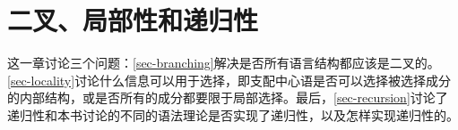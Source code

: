 
\chapter{二叉、局部性和递归性}
\label{Kapitel-Binarybranching-locality-recursion}

这一章讨论三个问题：\ref{sec-branching}解决是否所有语言结构都应该是二叉的。\ref{sec-locality}讨论什么信息可以用于选择，即支配中心语是否可以选择被选择成分的内部结构，或是否所有的成分都要限于局部选择。最后，\ref{sec-recursion}讨论了递归性和本书讨论的不同的语法理论是否实现了递归性，以及怎样实现递归性的。




